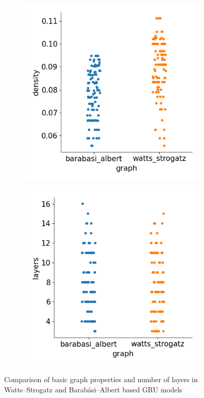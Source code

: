 \begin{figure}[H]
    \bigskip
    \begin{subfigure}{0.45\textwidth}
        \includegraphics[width=\linewidth]{images/results/random/gru/graph_density.png}
        \caption{} \label{fig:gru_graph_density}
    \end{subfigure}
    \hfill
    \begin{subfigure}{0.45\textwidth}
        \includegraphics[width=\linewidth]{images/results/random/gru/graph_layers.png}
        \caption{} \label{fig:gru_graph_layers}
    \end{subfigure}

\caption[Comparison of basic graph properties and number of layers in WS and BA based GRU models]{Comparison of basic graph properties and number of layers in Watts–Strogatz and Barabási–Albert based GRU models} \label{fig:gru_graphs}
\end{figure}

